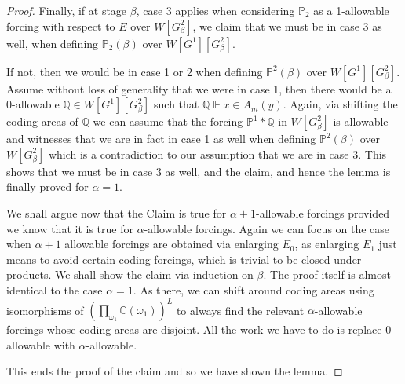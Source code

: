 \documentclass[10pt,a4paper]{amsart}
\newcommand{\forceP}{\mathbb{P}}
\newcommand{\forceQ}{\mathbb{Q}}
\begin{document}
\begin{proof}
Finally, if at stage $\beta$, case 3 applies when considering $\forceP_2$ as a 1-allowable forcing with respect to $E$ over $W[G^2_{\beta}]$, we claim that we must be in case 3 as well, when defining $\forceP_2 (\beta)$ over $W[G^1][G^2_{\beta}]$.

If not, then we would be in case 1 or 2 when defining $\forceP^2(
\beta)$ over $W[G^1][G^2_{\beta}]$. Assume without loss of generality that we were in case 1, then there would be a 0-allowable $\forceQ \in W[G^1][G^2_{\beta}]$ such that $\forceQ \Vdash x \in A_m(y)$. Again, via shifting the coding areas of $\forceQ$ we can assume that the forcing $\forceP^1 \ast\forceQ $ in $W[G^2_{\beta}]$ is allowable and witnesses that we are in fact in case 1 as well when defining  $\forceP^2(\beta)$ over $W[G^2_{\beta}]$ which is a contradiction to our assumption that we are in case 3. This shows that we must be in case 3 as well, and the claim, and hence the lemma is finally proved for $\alpha=1$.

 

\medskip

We shall argue now that the Claim is true for $\alpha+1$-allowable forcings provided we know that it is true for $\alpha$-allowable forcings. Again we can focus on the case when $\alpha+1$ allowable forcings are obtained via enlarging $E_0$, as enlarging $E_1$ just means to avoid certain coding forcings, which is trivial to be closed under products.
We shall show the claim via induction on $\beta$. The proof itself is almost identical to the case $\alpha=1$. As there, we can shift around coding areas using isomorphisms of $(\prod_{\omega_1} \mathbb{C} (\omega_1))^L$ to always find the relevant $\alpha$-allowable forcings whose coding areas are disjoint. All the work we have to do is replace $0$-allowable with $\alpha$-allowable.



This ends the proof of the claim and so we have shown the lemma.
\end{proof}
\end{document}
